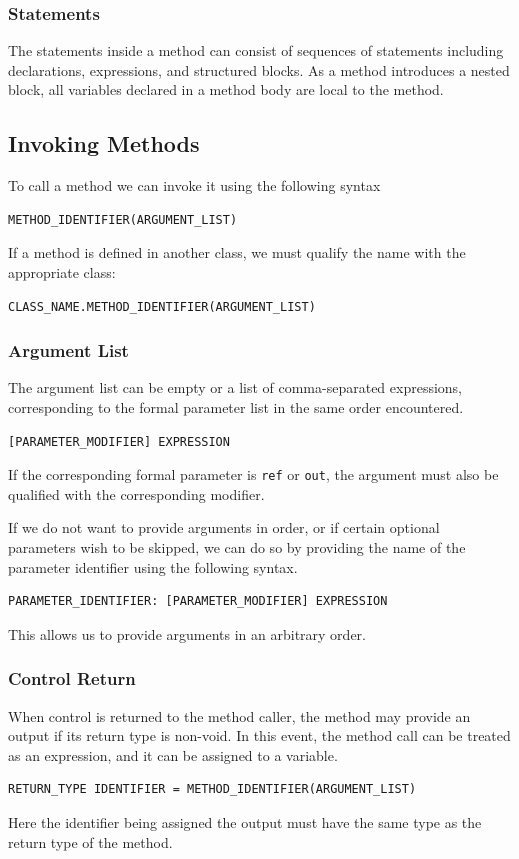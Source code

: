 \documentclass{article}
\begin{document}
\subsubsection{Statements}
The statements inside a method can consist of sequences of statements
including declarations, expressions, and structured blocks. As a method
introduces a nested block, all variables declared in a method body are
local to the method.
\subsection{Invoking Methods}
To call a method we can invoke it using the following syntax
\begin{verbatim}
METHOD_IDENTIFIER(ARGUMENT_LIST)
\end{verbatim}
If a method is defined in another class, we must qualify the name with
the appropriate class:
\begin{verbatim}
CLASS_NAME.METHOD_IDENTIFIER(ARGUMENT_LIST)
\end{verbatim}
\subsubsection{Argument List}
The argument list can be empty or a list of comma-separated
expressions, corresponding to the formal parameter list in the same
order encountered.
\begin{verbatim}
[PARAMETER_MODIFIER] EXPRESSION
\end{verbatim}
If the corresponding formal parameter is \texttt{ref} or
\texttt{out}, the argument must also be qualified with the
corresponding modifier.

If we do not want to provide arguments in order, or if certain optional
parameters wish to be skipped, we can do so by providing the name of
the parameter identifier using the following syntax.
\begin{verbatim}
PARAMETER_IDENTIFIER: [PARAMETER_MODIFIER] EXPRESSION
\end{verbatim}
This allows us to provide arguments in an arbitrary order.
\subsubsection{Control Return}
When control is returned to the method caller, the method may provide
an output if its return type is non-void. In this event, the method
call can be treated as an expression, and it can be assigned to a
variable.
\begin{verbatim}
RETURN_TYPE IDENTIFIER = METHOD_IDENTIFIER(ARGUMENT_LIST)
\end{verbatim}
Here the identifier being assigned the output must have the same type
as the return type of the method.
\end{document}
